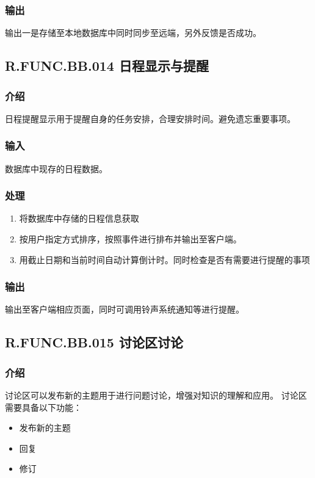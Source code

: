     \subsubsection{输出}
    输出一是存储至本地数据库中同时同步至远端，另外反馈是否成功。

  \subsection{R.FUNC.BB.014 日程显示与提醒}
    \subsubsection{介绍}
    日程提醒显示用于提醒自身的任务安排，合理安排时间。避免遗忘重要事项。
    \subsubsection{输入}
    数据库中现存的日程数据。
    \subsubsection{处理}
    \begin{enumerate}
      \item 将数据库中存储的日程信息获取
      \item 按用户指定方式排序，按照事件进行排布并输出至客户端。
      \item 用截止日期和当前时间自动计算倒计时。同时检查是否有需要进行提醒的事项
    \end{enumerate}
    \subsubsection{输出}
    输出至客户端相应页面，同时可调用铃声系统通知等进行提醒。

  \subsection{R.FUNC.BB.015 讨论区讨论}
    \subsubsection{介绍}
    讨论区可以发布新的主题用于进行问题讨论，增强对知识的理解和应用。
    讨论区需要具备以下功能：
    \begin{itemize}
      \item 发布新的主题
      \item 回复
      \item 修订
    \end{itemize}
